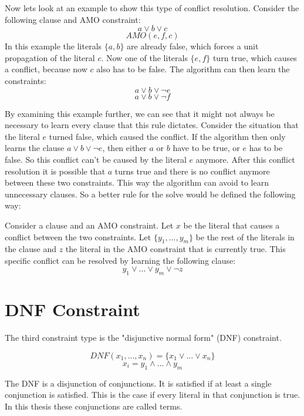 Now lets look at an example to show this type of conflict resolution. Consider the following clause and AMO constraint:
\begin{displaymath}
a \vee b \vee c
\end{displaymath}
\begin{displaymath}
AMO(e,f,c)
\end{displaymath}
In this example the literals $\{a,b\}$ are already false, which forces a unit propagation of the literal $c$. Now one of the literals $\{e,f\}$ turn true, which causes a conflict, because now $c$ also has to be false. The algorithm can then learn the constraints:
\begin{displaymath}
a \vee b \vee \neg e
\end{displaymath}
\begin{displaymath}
a \vee b \vee \neg f
\end{displaymath}

By examining this example further, we can see that it might not always be necessary to learn every clause that this rule dictates. Consider the situation that the literal $e$ turned false, which caused the conflict. If the algorithm then only learns the clause $a \vee b \vee \neg e$, then either $a$ or $b$ have to be true, or $e$ has to be false. So this conflict can't be caused by the literal $e$ anymore. After this conflict resolution it is possible that $a$ turns true and there is no conflict anymore between these two constraints. This way the algorithm can avoid to learn unnecessary clauses. So a better rule for the solve would be defined the following way:

\begin{leftbar}
Consider a clause and an AMO constraint. Let $x$ be the literal that causes a conflict between the two constraints. Let $\{y_1,...,y_m\}$ be the rest of the literals in the clause and $z$ the literal in the AMO constraint that is currently true. This specific conflict can be resolved by learning the following clause:
\begin{displaymath}
y_1 \vee ... \vee y_m \vee \neg z
\end{displaymath}

\end{leftbar}

\section{DNF Constraint}
The third constraint type is the "disjunctive normal form" (DNF) constraint.
\begin{leftbar}
\begin{displaymath}
DNF(x_1,...,x_n) = \{x_1 \vee ... \vee x_n \}
\end{displaymath}
\begin{displaymath}
x_i = y_1 \wedge ... \wedge y_m
\end{displaymath}
\end{leftbar}
The DNF is a disjunction of conjunctions. It is satisfied if at least a single conjunction is satisfied. This is the case if every literal in that conjunction is true. In this thesis these conjunctions are called terms.

